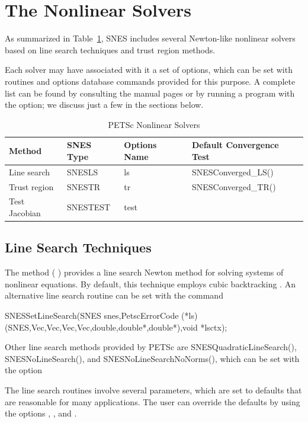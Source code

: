 \section{The Nonlinear Solvers}
\label{sec_nlsolvers}

As summarized in Table~\ref{tab_snesdefaults}, SNES includes several
Newton-like nonlinear solvers based on line search techniques and
trust region methods.

Each solver may have associated with it a set of options, which can be
set with routines and options database commands provided for this
purpose.  A complete list can be found by consulting the manual pages
or by running a program with the  option; we discuss just a
few in the sections below.

\begin{table}
\begin{center}
\begin{tabular}{llll}
{\bf Method}    &{\bf SNES Type}& {\bf Options Name}    &{\bf Default Convergence Test}\\
\hline
Line search     & SNESLS   & ls   & SNESConverged\_LS()\\
Trust region    & SNESTR   & tr   & SNESConverged\_TR()\\
Test Jacobian   & SNESTEST        & test  & \\
\hline
\end{tabular}
\end{center}
\label{tab_snesdefaults}
\caption{PETSc Nonlinear Solvers}
\end{table}

\subsection{Line Search Techniques} 

The method  ( ) provides a line
search Newton method for solving systems of nonlinear equations.  By
default, this technique employs cubic backtracking \cite{dennis:83}.
An alternative line search routine can be set with the command
\begin{tabbing}
  SNESSetLineSearch(SNES snes,PetscErrorCode (*ls)(SNES,Vec,Vec,Vec,Vec,double,double*,double*),void *lsctx);
\end{tabbing}
Other line search methods provided by PETSc are 
SNESQuadraticLineSearch(), SNESNoLineSearch(), and SNESNoLineSearchNoNorms(),
 
which can be set with the option 
\begin{tabbing}
\end{tabbing}
The line search routines involve several parameters, which are set
to defaults that are reasonable for many applications.  The user
can override the defaults by using the options
, 
, and 
. 

